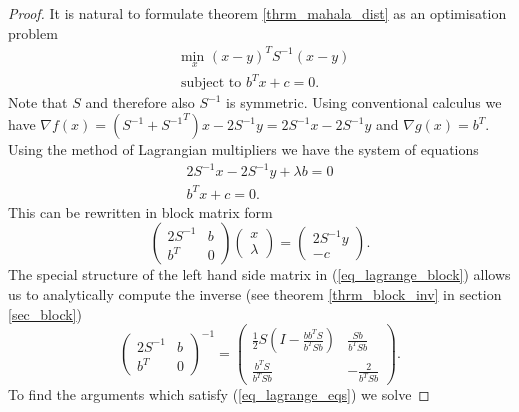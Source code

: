 \begin{proof}
It is natural to formulate theorem \ref{thrm_mahala_dist} as an optimisation problem
\begin{equation}
\begin{aligned}
&\underset{x}{\text{min }} (x-y)^TS^{-1}(x-y)\\
& \text{subject to } b^Tx+c = 0.
\end{aligned}
\label{eq_mahala_optim}
\end{equation}
Note that $S$ and therefore also $S^{-1}$ is symmetric. Using conventional calculus we have $\nabla f(x) = (S^{-1} + {S^{-1}}^T)x - 2S^{-1}y = 2S^{-1}x - 2S^{-1}y$ and $\nabla g(x) = b^T$. Using the method of Lagrangian multipliers \cite{forst} we have the system of equations
\begin{equation}
\begin{aligned}
2S^{-1}x - 2S^{-1}y + \lambda b = 0 \\
b^Tx+c = 0.
\end{aligned}
\label{eq_lagrange_eqs}
\end{equation}
This can be rewritten in block matrix form 
\begin{equation}
\begin{pmatrix}
2S^{-1} & b \\ b^T & 0
\end{pmatrix} \begin{pmatrix}
x \\ \lambda
\end{pmatrix} = \begin{pmatrix}
2S^{-1}y \\ -c
\end{pmatrix}.
\label{eq_lagrange_block}
\end{equation}
The special structure of the left hand side matrix in (\ref{eq_lagrange_block}) allows us to analytically compute the inverse (see theorem \ref{thrm_block_inv} in section \ref{sec_block})
\begin{equation}
\begin{pmatrix}
2S^{-1} & b \\ b^T & 0
\end{pmatrix}^{-1} = \begin{pmatrix}
\frac{1}{2}S(I-\frac{bb^TS}{b^TSb}) & \frac{Sb}{b^TSb} \\ \frac{b^TS}{b^TSb} & -\frac{2}{b^TSb}
\end{pmatrix}.
\label{eq_lagrance_block_inverse}
\end{equation}
To find the arguments which satisfy (\ref{eq_lagrange_eqs}) we solve

\end{proof}
